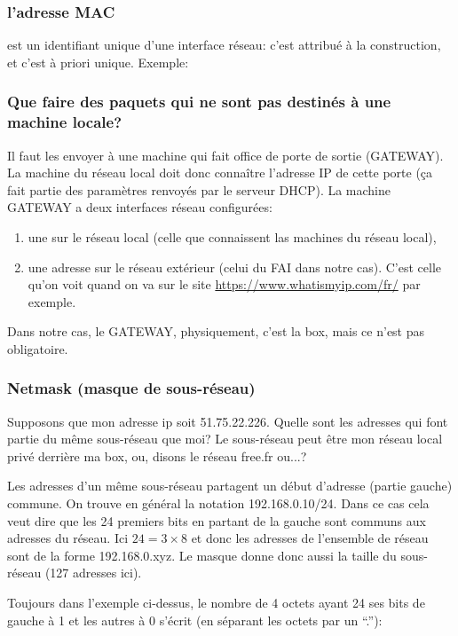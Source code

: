 \subsubsection{l'adresse MAC} est un identifiant unique d'une
interface réseau: c'est attribué à la construction, et c'est à priori
unique. Exemple:



\subsubsection{Que faire des paquets qui ne sont pas destinés à une
  machine locale?} Il faut les envoyer à une machine qui fait office
de porte de sortie (GATEWAY). La machine du réseau local doit donc
connaître l'adresse IP de cette porte (ça fait partie des paramètres
renvoyés par le serveur DHCP). La machine GATEWAY a deux interfaces
réseau configurées:
\begin{enumerate}
  \item une sur le réseau local (celle que connaissent las machines du
    réseau local),
  \item une adresse sur le réseau extérieur (celui du FAI dans notre
    cas). C'est celle qu'on voit quand on va sur le site
    \url{https://www.whatismyip.com/fr/} par exemple.
\end{enumerate}
Dans notre cas, le GATEWAY, physiquement, c'est la box, mais ce n'est
pas obligatoire.
\subsubsection{Netmask (masque de sous-réseau)}
Supposons que mon adresse ip soit 51.75.22.226. Quelle sont les
adresses qui font partie du même sous-réseau que moi? Le sous-réseau
peut être mon réseau local privé derrière ma box, ou, disons le réseau
free.fr ou...?

Les adresses d'un même sous-réseau partagent un début d'adresse (partie
gauche) commune. On trouve en général la notation
192.168.0.10/24. Dans ce cas cela veut dire que les 24 premiers bits
en partant de la gauche sont communs aux adresses du réseau. Ici $24 =
3 \times 8$ et donc les adresses de l'ensemble  de réseau sont de la
forme 192.168.0.xyz. Le masque donne donc aussi la taille du
sous-réseau (127 adresses ici).

Toujours dans l'exemple ci-dessus, le nombre de 4 octets ayant 24 ses
bits de gauche à 1 et les autres à 0 s'écrit (en séparant les octets
par un ``.''): 


